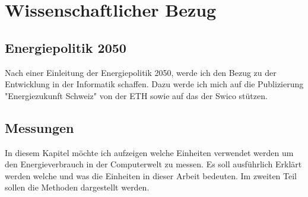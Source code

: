 \chapter{Wissenschaftlicher Bezug}

\section{Energiepolitik 2050}

Nach einer Einleitung der Energiepolitik 2050, werde ich den Bezug zu der Entwicklung in der
Informatik schaffen. Dazu werde ich mich auf die Publizierung
"Energiezukunft Schweiz"\cite{eth_energiezukunft_schweiz} von der ETH sowie auf das\cite{swico_datenblatt}
der Swico stützen.

\section{Messungen}
In diesem Kapitel möchte ich aufzeigen welche Einheiten verwendet werden um den Energieverbrauch
in der Computerwelt zu messen. Es soll ausführlich Erklärt werden welche und was die Einheiten in dieser Arbeit
bedeuten. Im zweiten Teil sollen die Methoden dargestellt werden.


